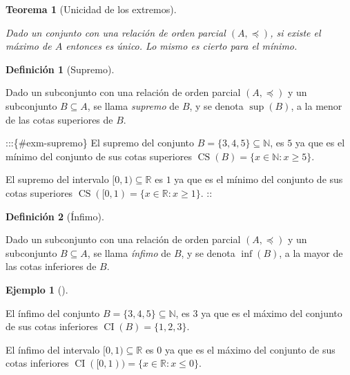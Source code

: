 \documentclass[
  a4paper,
]{scrreport}
\theoremstyle{definition}
\newtheorem{example}{Ejemplo}[chapter]
\theoremstyle{plain}
\theoremstyle{plain}
\newtheorem{theorem}{Teorema}[chapter]
\theoremstyle{definition}
\newtheorem{definition}{Definición}[chapter]
\theoremstyle{plain}
\theoremstyle{remark}
\begin{document}
\begin{theorem}[Unicidad de los
extremos]\protect\hypertarget{thm-unicidad-extremos}{}\label{thm-unicidad-extremos}

Dado un conjunto con una relación de orden parcial \((A,\preceq)\), si
existe el máximo de \(A\) entonces es único. Lo mismo es cierto para el
mínimo.

\end{theorem}

\begin{definition}[Supremo]\protect\hypertarget{def-supremo-conjunto}{}\label{def-supremo-conjunto}

Dado un subconjunto con una relación de orden parcial \((A,\preceq)\) y
un subconjunto \(B\subseteq A\), se llama \emph{supremo} de \(B\), y se
denota \(\sup(B)\), a la menor de las cotas superiores de \(B\).

\end{definition}

:::\{\#exm-supremo\} El supremo del conjunto
\(B=\{3, 4, 5\}\subseteq \mathbb{N}\), es \(5\) ya que es el mínimo del
conjunto de sus cotas superiores
\(\operatorname{CS}(B)=\{x\in \mathbb{N}:x\geq 5\}\).

El supremo del intervalo \([0,1)\subseteq \mathbb{R}\) es \(1\) ya que
es el mínimo del conjunto de sus cotas superiores
\(\operatorname{CS}([0,1) = \{x\in \mathbb{R}:x\geq 1\}\). ::

\begin{definition}[Ínfimo]\protect\hypertarget{def-infimo-conjunto}{}\label{def-infimo-conjunto}

Dado un subconjunto con una relación de orden parcial \((A,\preceq)\) y
un subconjunto \(B\subseteq A\), se llama \emph{ínfimo} de \(B\), y se
denota \(\inf(B)\), a la mayor de las cotas inferiores de \(B\).

\end{definition}

\begin{example}[]\protect\hypertarget{exm-infimo}{}\label{exm-infimo}

El ínfimo del conjunto \(B=\{3, 4, 5\}\subseteq \mathbb{N}\), es \(3\)
ya que es el máximo del conjunto de sus cotas inferiores
\(\operatorname{CI}(B)=\{1, 2, 3\}\).

El ínfimo del intervalo \([0,1)\subseteq \mathbb{R}\) es \(0\) ya que es
el máximo del conjunto de sus cotas inferiores
\(\operatorname{CI}([0,1)) = \{x\in \mathbb{R}:x\leq 0\}\).

\end{example}
\end{document}
